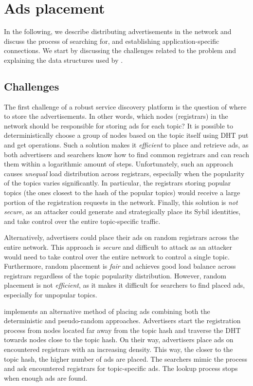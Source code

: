 
\section{Ads placement}
\label{sec:placement}
In the following, we describe distributing advertisements in the network and discuss the process of searching for, and establishing application-specific connections. We start by discussing the challenges related to the problem and explaining the data structures used by \sysname. 

\subsection{Challenges}
The first challenge of a robust service discovery platform is the question of where to store the advertisements. In other words, which nodes (registrars) in the network should be responsible for storing ads for each topic? It is possible to deterministically choose a group of nodes based on the topic itself using DHT put and get operations. Such a solution makes it \emph{efficient} to place and retrieve ads, as both advertisers and searchers know how to find common registrars and can reach them within a logarithmic amount of steps. Unfortunately, such an approach causes \emph{unequal} load distribution across registrars, especially when the popularity of the topics varies significantly. In particular, the registrars storing popular topics (\ie the ones closest to the hash of the popular topics) would receive a large portion of the registration requests in the network. Finally, this solution is \emph{not secure}, as an attacker could generate and strategically place its Sybil identities, and take control over the entire topic-specific traffic. 

Alternatively, advertisers could place their ads on random registrars across the entire network. This approach is \emph{secure} and difficult to attack as an attacker would need to take control over the entire network to control a single topic. Furthermore, random placement is \emph{fair} and achieves good load balance across registrars regardless of the topic popularity distribution. However, random placement is not \emph{efficient}, as it makes it difficult for searchers to find placed ads, especially for unpopular topics. 

\sysname implements an alternative method of placing ads combining both the deterministic and pseudo-random approaches. Advertisers start the registration process from nodes located far away from the topic hash and traverse the DHT towards nodes close to the topic hash. On their way, advertisers place ads on encountered registrars with an increasing density. This way, the closer to the topic hash, the higher number of ads are placed. The searchers mimic the process and ask encountered registrars for topic-specific ads. The lookup process stops when enough ads are found.

